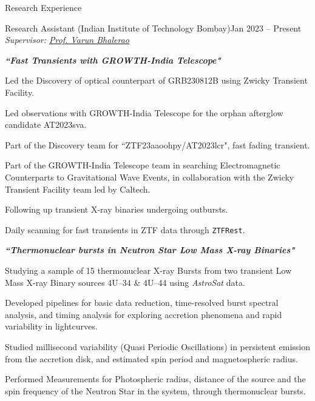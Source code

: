 \begin{rSection}{Research Experience}
\hspace{-1.2em}\begin{rSubsection}{Research Assistant (Indian Institute of Technology Bombay)}{Jan 2023 -- Present}{ \emph{Supervisor: \href{https://www.phy.iitb.ac.in/en/content/varun-bhalerao}{Prof. Varun Bhalerao}}}{}
\item[]  \hspace{-1em} \textbf{\textit{``Fast Transients with GROWTH-India Telescope"}}
\item Led the Discovery of optical counterpart of GRB230812B using Zwicky Transient Facility.
\item Led observations with GROWTH-India Telescope for the orphan afterglow candidate AT2023sva.
\item Part of the Discovery team for ``ZTF23aaoohpy/AT2023lcr", fast fading transient.
\item Part of the GROWTH-India Telescope team in searching Electromagnetic Counterparts to Gravitational Wave Events, in collaboration with the Zwicky Transient Facility team led by Caltech.
\item Following up transient X-ray binaries undergoing outbursts.
\item Daily scanning for fast transients in ZTF data through \texttt{ZTFRest}.
\newline
\newline
\item[]  \hspace{-1em} \textbf{\textit{``Thermonuclear bursts in Neutron Star Low Mass X-ray Binaries"}}
\item Studying a sample of 15 thermonuclear X-ray Bursts from two transient Low Mass X-ray Binary sources 4U--34 \& 4U--44 using \textit{AstroSat} data.
\item Developed pipelines for basic data reduction, time-resolved burst spectral analysis, and timing analysis for exploring accretion phenomena and rapid variability in lightcurves.
\item Studied millisecond variability (Quasi Periodic Oscillations) in persistent emission from the accretion disk, and estimated spin period and magnetospheric radius.
\item Performed Measurements for Photospheric radius, distance of the source and the spin frequency of the Neutron Star in the system, through thermonuclear bursts.

\end{rSubsection}


\end{rSection}
